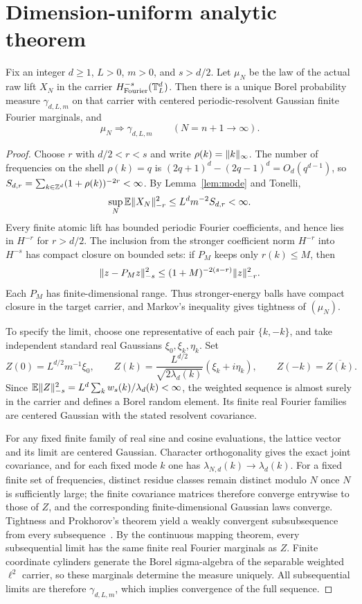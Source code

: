 \section{Dimension-uniform analytic theorem}\label{sec:general}
\begin{theorem}\label{thm:general}
Fix an integer $d\geq1$, $L>0$, $m>0$, and $s>d/2$. Let $\mu_N$ be the law of the actual raw lift $X_N$ in the carrier $H^{-s}_{\mathrm{Fourier}}(\mathbb T_L^d)$. Then there is a unique Borel probability measure $\gamma_{d,L,m}$ on that carrier with centered periodic-resolvent Gaussian finite Fourier marginals, and
\[
 \mu_N\Longrightarrow\gamma_{d,L,m}\qquad(N=n+1\to\infty).
\]
\end{theorem}
\begin{proof}
Choose $r$ with $d/2<r<s$ and write $\rho(k)=\lVert k\rVert_\infty$. The number of frequencies on the shell $\rho(k)=q$ is $(2q+1)^d-(2q-1)^d=O_d(q^{d-1})$, so $S_{d,r}=\sum_{k\in\mathbb Z^d}(1+\rho(k))^{-2r}<\infty$. By Lemma~\ref{lem:mode} and Tonelli,
\[
 \sup_N\mathbb E\lVert X_N\rVert_{-r}^2\leq L^d m^{-2}S_{d,r}<\infty.
\]
Every finite atomic lift has bounded periodic Fourier coefficients, and hence lies in $H^{-r}$ for $r>d/2$. The inclusion from the stronger coefficient norm $H^{-r}$ into $H^{-s}$ has compact closure on bounded sets: if $P_M$ keeps only $r(k)\leq M$, then
\[
 \lVert z-P_Mz\rVert_{-s}^2\leq(1+M)^{-2(s-r)}\lVert z\rVert_{-r}^2.
\]
Each $P_M$ has finite-dimensional range. Thus stronger-energy balls have compact closure in the target carrier, and Markov's inequality gives tightness of $(\mu_N)$.

To specify the limit, choose one representative of each pair $\{k,-k\}$, and take independent standard real Gaussians $\xi_0,\xi_k,\eta_k$. Set
\[
 Z(0)=L^{d/2}m^{-1}\xi_0,\qquad
 Z(k)=\frac{L^{d/2}}{\sqrt{2\lambda_d(k)}}(\xi_k+i\eta_k),\qquad Z(-k)=\overline{Z(k)}.
\]
Since $\mathbb E\lVert Z\rVert_{-s}^2=L^d\sum_kw_s(k)/\lambda_d(k)<\infty$, the weighted sequence is almost surely in the carrier and defines a Borel random element. Its finite real Fourier families are centered Gaussian with the stated resolvent covariance.

For any fixed finite family of real sine and cosine evaluations, the lattice vector and its limit are centered Gaussian. Character orthogonality gives the exact joint covariance, and for each fixed mode $k$ one has $\lambda_{N,d}(k)\to\lambda_d(k)$. For a fixed finite set of frequencies, distinct residue classes remain distinct modulo $N$ once $N$ is sufficiently large; the finite covariance matrices therefore converge entrywise to those of $Z$, and the corresponding finite-dimensional Gaussian laws converge. Tightness and Prokhorov's theorem yield a weakly convergent subsubsequence from every subsequence~\cite{billingsley}. By the continuous mapping theorem, every subsequential limit has the same finite real Fourier marginals as $Z$. Finite coordinate cylinders generate the Borel sigma-algebra of the separable weighted $\ell^2$ carrier, so these marginals determine the measure uniquely. All subsequential limits are therefore $\gamma_{d,L,m}$, which implies convergence of the full sequence.
\end{proof}

